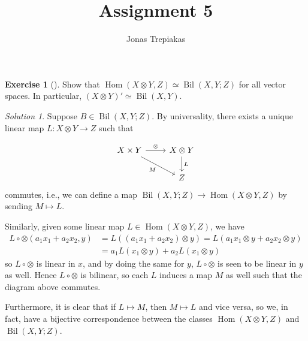 \documentclass[reqno]{amsart}
\title{Assignment 5}
\author{Jonas Trepiakas}
\theoremstyle{definition}
\newtheorem{exercise}[theorem]{Exercise}
\theoremstyle{remark}
\newtheorem*{solution}{Solution}
\DeclareMathOperator{\Hom}{Hom}
\DeclareMathOperator{\Bil}{Bil}
\begin{document}
\maketitle


    \begin{exercise}[]
        Show that $\Hom \left( X \otimes Y, Z \right) 
        \simeq \Bil \left( X, Y; Z \right) $ for all
        vector spaces. In particular, $\left( X \otimes
        Y\right)' \simeq \Bil(X,Y)$.
    \end{exercise}

    \begin{solution}
        Suppose
        $B \in \Bil (X,Y; Z)$. By universality,
        there exists a unique linear map
        $L \colon X \otimes Y \to Z$ such that

        \begin{equation*}
        \begin{tikzcd}
            X \times Y \ar[r, "\otimes"] \ar[dr, "M"']
            & X \otimes Y \ar[d, "L"] \\
                              & Z
        \end{tikzcd}
        \end{equation*}
        commutes, i.e., we can define a map
        $\Bil \left( X, Y ; Z \right) \to 
        \Hom \left( X \otimes Y , Z \right) $ by
        sending $M \mapsto L$.

        Similarly, given some linear map
        $L \in \Hom \left( X \otimes Y, Z \right) $, we have
        \begin{align*}
            L \circ \otimes \left( a_1 x_1 + a_2 x_2, y \right) 
            &= L \left( \left( a_1 x_1 + a_2 x_2  \right) 
            \otimes y\right) 
            = L \left( a_1 x_1 \otimes y +a_2 x_2 \otimes y \right) \\
            &=a_1  L \left(  x_1 \otimes y \right) +
            a_2 L \left( x_1 \otimes y \right) 
        \end{align*}
        so $L \circ \otimes$ is linear in $x$,
        and
        by doing the same for $y$, $L \circ \otimes $ is
        seen to be linear in $y$ as well. Hence
        $L \circ \otimes  $ is bilinear, so
        each $L$ induces a map $M$ as well such that
        the diagram above commutes.

        Furthermore, it is clear that if
        $L \mapsto M$, then $M \mapsto L$ and vice versa,
        so we, in fact, have a bijective correspondence
        between the classes
        $\Hom \left( X \otimes Y, Z \right) $ and
        $\Bil \left( X, Y ; Z \right) $.\\
        \linebreak
        



\end{solution}
\end{document}
